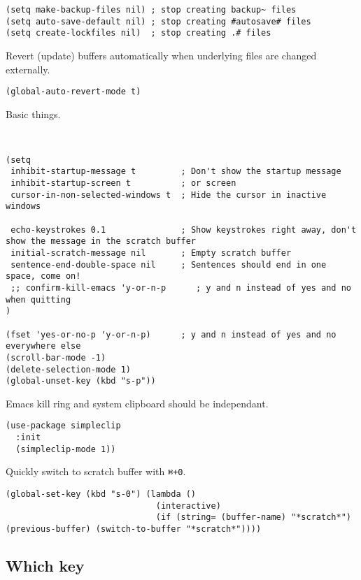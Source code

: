 \documentclass[11pt]{article}
\begin{document}
\begin{verbatim}
(setq make-backup-files nil) ; stop creating backup~ files
(setq auto-save-default nil) ; stop creating #autosave# files
(setq create-lockfiles nil)  ; stop creating .# files
\end{verbatim}

Revert (update) buffers automatically when underlying files are changed externally.

\begin{verbatim}
(global-auto-revert-mode t)
\end{verbatim}

Basic things.

\begin{verbatim}


(setq
 inhibit-startup-message t         ; Don't show the startup message
 inhibit-startup-screen t          ; or screen
 cursor-in-non-selected-windows t  ; Hide the cursor in inactive windows

 echo-keystrokes 0.1               ; Show keystrokes right away, don't show the message in the scratch buffer
 initial-scratch-message nil       ; Empty scratch buffer
 sentence-end-double-space nil     ; Sentences should end in one space, come on!
 ;; confirm-kill-emacs 'y-or-n-p      ; y and n instead of yes and no when quitting
)

(fset 'yes-or-no-p 'y-or-n-p)      ; y and n instead of yes and no everywhere else
(scroll-bar-mode -1)
(delete-selection-mode 1)
(global-unset-key (kbd "s-p"))
\end{verbatim}

Emacs kill ring and system clipboard should be independant.
\begin{verbatim}
(use-package simpleclip
  :init
  (simpleclip-mode 1))
\end{verbatim}

Quickly switch to scratch buffer with \texttt{⌘+0}.

\begin{verbatim}
(global-set-key (kbd "s-0") (lambda ()
                              (interactive)
                              (if (string= (buffer-name) "*scratch*") (previous-buffer) (switch-to-buffer "*scratch*"))))
\end{verbatim}

\subsection{Which key}
\label{sec:orgb795879}
\end{document}
